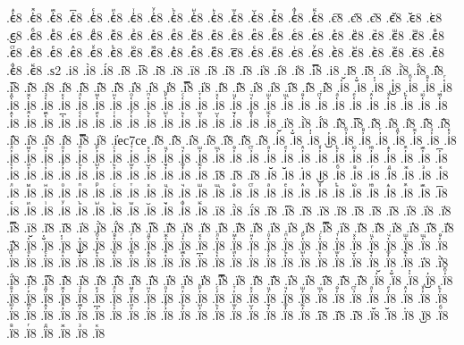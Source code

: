 {.є҆ⷽ8
.є҆ⷾ8
.є҆ⷿ8
.є҆꙯8
.є҆ꙴ8
.є҆ꙵ8
.є҆ꙶ8
.є҆ꙷ8
.є҆ꙸ8
.є҆ꙹ8
.є҆ꙺ8
.є҆ꙻ8
.є҆꙼8
.є҆꙽8
.є҆ꚞ8
.є҆ꚟ8
.є҇8
.є᷀8
.є᷁8
.є᷶8
.є᷷8
.є᷸8
.є᷹8
.єⷠ8
.єⷡ8
.єⷢ8
.єⷣ8
.єⷤ8
.єⷥ8
.єⷦ8
.єⷧ8
.єⷨ8
.єⷩ8
.єⷪ8
.єⷫ8
.єⷬ8
.єⷭ8
.єⷮ8
.єⷯ8
.єⷰ8
.єⷱ8
.єⷲ8
.єⷳ8
.єⷴ8
.єⷵ8
.єⷶ8
.єⷷ8
.єⷸ8
.єⷹ8
.єⷺ8
.єⷻ8
.єⷼ8
.єⷽ8
.єⷾ8
.єⷿ8
.є꙯8
.єꙴ8
.єꙵ8
.єꙶ8
.єꙷ8
.єꙸ8
.єꙹ8
.єꙺ8
.єꙻ8
.є꙼8
.є꙽8
.єꚞ8
.єꚟ8
.ѕ2
.і8
.і̀8
.і́8
.і̂8
.і̅8
.і̆8
.і̇8
.ї8
.і̋8
.і̏8
.і̑8
.і̓8
.і̔8
.і̾8
.і̿8
.і͘8
.і҃8
.і҄8
.і҅8
.і҅̀8
.і҅́8
.і҅̂8
.і҅̅8
.і҅̆8
.і҅̇8
.і҅̈8
.і҅̋8
.і҅̏8
.і҅̑8
.і҅̓8
.і҅̔8
.і҅̾8
.і҅̿8
.і҅͘8
.і҅҃8
.і҅҄8
.і҅҅8
.і҅҆8
.і҅҇8
.і҅᷀8
.і҅᷁8
.і҅᷶8
.і᷷҅8
.і᷸҅8
.і᷹҅8
.і҅ⷠ8
.і҅ⷡ8
.і҅ⷢ8
.і҅ⷣ8
.і҅ⷤ8
.і҅ⷥ8
.і҅ⷦ8
.і҅ⷧ8
.і҅ⷨ8
.і҅ⷩ8
.і҅ⷪ8
.і҅ⷫ8
.і҅ⷬ8
.і҅ⷭ8
.і҅ⷮ8
.і҅ⷯ8
.і҅ⷰ8
.і҅ⷱ8
.і҅ⷲ8
.і҅ⷳ8
.і҅ⷴ8
.і҅ⷵ8
.і҅ⷶ8
.і҅ⷷ8
.і҅ⷸ8
.і҅ⷹ8
.і҅ⷺ8
.і҅ⷻ8
.і҅ⷼ8
.і҅ⷽ8
.і҅ⷾ8
.і҅ⷿ8
.і҅꙯8
.і҅ꙴ8
.і҅ꙵ8
.і҅ꙶ8
.і҅ꙷ8
.і҅ꙸ8
.і҅ꙹ8
.і҅ꙺ8
.і҅ꙻ8
.і҅꙼8
.і҅꙽8
.і҅ꚞ8
.і҅ꚟ8
.і҆8
.і҆̀8
.і҆́8
.і҆̂8
.і҆̅8
.і҆̆8
.і҆̇8
.і҆̈8
.і҆̋8
.і҆̏8
.і҆̑8
.і҆̓8
.і҆̔8
.і҆̾8
.і҆̿8
.і҆͘8
.і҆ес7се
.і҆҃8
.і҆҄8
.і҆҅8
.і҆҆8
.і҆҇8
.і҆᷀8
.і҆᷁8
.і҆᷶8
.і᷷҆8
.і᷸҆8
.і᷹҆8
.і҆ⷠ8
.і҆ⷡ8
.і҆ⷢ8
.і҆ⷣ8
.і҆ⷤ8
.і҆ⷥ8
.і҆ⷦ8
.і҆ⷧ8
.і҆ⷨ8
.і҆ⷩ8
.і҆ⷪ8
.і҆ⷫ8
.і҆ⷬ8
.і҆ⷭ8
.і҆ⷮ8
.і҆ⷯ8
.і҆ⷰ8
.і҆ⷱ8
.і҆ⷲ8
.і҆ⷳ8
.і҆ⷴ8
.і҆ⷵ8
.і҆ⷶ8
.і҆ⷷ8
.і҆ⷸ8
.і҆ⷹ8
.і҆ⷺ8
.і҆ⷻ8
.і҆ⷼ8
.і҆ⷽ8
.і҆ⷾ8
.і҆ⷿ8
.і҆꙯8
.і҆ꙴ8
.і҆ꙵ8
.і҆ꙶ8
.і҆ꙷ8
.і҆ꙸ8
.і҆ꙹ8
.і҆ꙺ8
.і҆ꙻ8
.і҆꙼8
.і҆꙽8
.і҆ꚞ8
.і҆ꚟ8
.і҇8
.і᷀8
.і᷁8
.і᷶8
.і᷷8
.і᷸8
.і᷹8
.іⷠ8
.іⷡ8
.іⷢ8
.іⷣ8
.іⷤ8
.іⷥ8
.іⷦ8
.іⷧ8
.іⷨ8
.іⷩ8
.іⷪ8
.іⷫ8
.іⷬ8
.іⷭ8
.іⷮ8
.іⷯ8
.іⷰ8
.іⷱ8
.іⷲ8
.іⷳ8
.іⷴ8
.іⷵ8
.іⷶ8
.іⷷ8
.іⷸ8
.іⷹ8
.іⷺ8
.іⷻ8
.іⷼ8
.іⷽ8
.іⷾ8
.іⷿ8
.і꙯8
.іꙴ8
.іꙵ8
.іꙶ8
.іꙷ8
.іꙸ8
.іꙹ8
.іꙺ8
.іꙻ8
.і꙼8
.і꙽8
.іꚞ8
.іꚟ8
.ї8
.ї̀8
.ї́8
.ї̂8
.ї̅8
.ї̆8
.ї̇8
.ї̈8
.ї̋8
.ї̏8
.ї̑8
.ї̓8
.ї̔8
.ї̾8
.ї̿8
.ї͘8
.ї҃8
.ї҄8
.ї҅8
.ї҅̀8
.ї҅́8
.ї҅̂8
.ї҅̅8
.ї҅̆8
.ї҅̇8
.ї҅̈8
.ї҅̋8
.ї҅̏8
.ї҅̑8
.ї҅̓8
.ї҅̔8
.ї҅̾8
.ї҅̿8
.ї҅͘8
.ї҅҃8
.ї҅҄8
.ї҅҅8
.ї҅҆8
.ї҅҇8
.ї҅᷀8
.ї҅᷁8
.ї҅᷶8
.ї᷷҅8
.ї᷸҅8
.ї᷹҅8
.ї҅ⷠ8
.ї҅ⷡ8
.ї҅ⷢ8
.ї҅ⷣ8
.ї҅ⷤ8
.ї҅ⷥ8
.ї҅ⷦ8
.ї҅ⷧ8
.ї҅ⷨ8
.ї҅ⷩ8
.ї҅ⷪ8
.ї҅ⷫ8
.ї҅ⷬ8
.ї҅ⷭ8
.ї҅ⷮ8
.ї҅ⷯ8
.ї҅ⷰ8
.ї҅ⷱ8
.ї҅ⷲ8
.ї҅ⷳ8
.ї҅ⷴ8
.ї҅ⷵ8
.ї҅ⷶ8
.ї҅ⷷ8
.ї҅ⷸ8
.ї҅ⷹ8
.ї҅ⷺ8
.ї҅ⷻ8
.ї҅ⷼ8
.ї҅ⷽ8
.ї҅ⷾ8
.ї҅ⷿ8
.ї҅꙯8
.ї҅ꙴ8
.ї҅ꙵ8
.ї҅ꙶ8
.ї҅ꙷ8
.ї҅ꙸ8
.ї҅ꙹ8
.ї҅ꙺ8
.ї҅ꙻ8
.ї҅꙼8
.ї҅꙽8
.ї҅ꚞ8
.ї҅ꚟ8
.ї҆8
.ї҆̀8
.ї҆́8
.ї҆̂8
.ї҆̅8
.ї҆̆8
.ї҆̇8
.ї҆̈8
.ї҆̋8
.ї҆̏8
.ї҆̑8
.ї҆̓8
.ї҆̔8
.ї҆̾8
.ї҆̿8
.ї҆͘8
.ї҆҃8
.ї҆҄8
.ї҆҅8
.ї҆҆8
.ї҆҇8
.ї҆᷀8
.ї҆᷁8
.ї҆᷶8
.ї᷷҆8
.ї᷸҆8
.ї᷹҆8
.ї҆ⷠ8
.ї҆ⷡ8
.ї҆ⷢ8
.ї҆ⷣ8
.ї҆ⷤ8
.ї҆ⷥ8
.ї҆ⷦ8
.ї҆ⷧ8
.ї҆ⷨ8
.ї҆ⷩ8
.ї҆ⷪ8
.ї҆ⷫ8
.ї҆ⷬ8
.ї҆ⷭ8
.ї҆ⷮ8
.ї҆ⷯ8
.ї҆ⷰ8
.ї҆ⷱ8
.ї҆ⷲ8
.ї҆ⷳ8
.ї҆ⷴ8
.ї҆ⷵ8
.ї҆ⷶ8
.ї҆ⷷ8
.ї҆ⷸ8
.ї҆ⷹ8
.ї҆ⷺ8
.ї҆ⷻ8
.ї҆ⷼ8
.ї҆ⷽ8
.ї҆ⷾ8
.ї҆ⷿ8
.ї҆꙯8
.ї҆ꙴ8
.ї҆ꙵ8
.ї҆ꙶ8
.ї҆ꙷ8
.ї҆ꙸ8
.ї҆ꙹ8
.ї҆ꙺ8
.ї҆ꙻ8
.ї҆꙼8
.ї҆꙽8
.ї҆ꚞ8
.ї҆ꚟ8
.ї҇8
.ї᷀8
.ї᷁8
.ї᷶8
.ї᷷8
.ї᷸8
.ї᷹8
.їⷠ8
.їⷡ8
.їⷢ8
.їⷣ8
.їⷤ8
.їⷥ8
.їⷦ8
}
